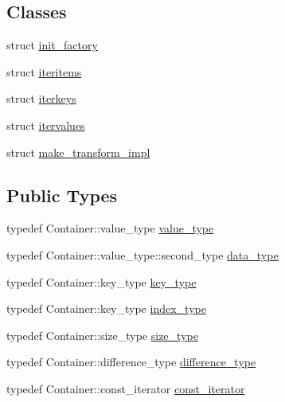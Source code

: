 \subsection*{Classes}
\begin{DoxyCompactItemize}
\item 
struct \hyperlink{structboost_1_1python_1_1std__map__indexing__suite_1_1init__factory}{init\+\_\+factory}
\item 
struct \hyperlink{structboost_1_1python_1_1std__map__indexing__suite_1_1iteritems}{iteritems}
\item 
struct \hyperlink{structboost_1_1python_1_1std__map__indexing__suite_1_1iterkeys}{iterkeys}
\item 
struct \hyperlink{structboost_1_1python_1_1std__map__indexing__suite_1_1itervalues}{itervalues}
\item 
struct \hyperlink{structboost_1_1python_1_1std__map__indexing__suite_1_1make__transform__impl}{make\+\_\+transform\+\_\+impl}
\end{DoxyCompactItemize}
\subsection*{Public Types}
\begin{DoxyCompactItemize}
\item 
typedef Container\+::value\+\_\+type \hyperlink{classboost_1_1python_1_1std__map__indexing__suite_aff9ed68cf30e805a04a313d92c62ab38}{value\+\_\+type}
\item 
typedef Container\+::value\+\_\+type\+::second\+\_\+type \hyperlink{classboost_1_1python_1_1std__map__indexing__suite_a3e9a6a8b8ba34759cf0ba99fe5966041}{data\+\_\+type}
\item 
typedef Container\+::key\+\_\+type \hyperlink{classboost_1_1python_1_1std__map__indexing__suite_a4e2daeb60a58d6ce9964e0ea27680009}{key\+\_\+type}
\item 
typedef Container\+::key\+\_\+type \hyperlink{classboost_1_1python_1_1std__map__indexing__suite_a4b2ac75883fba93dbca6d9e83197c842}{index\+\_\+type}
\item 
typedef Container\+::size\+\_\+type \hyperlink{classboost_1_1python_1_1std__map__indexing__suite_ad1c24ad53b2e27b061f75591c74296c2}{size\+\_\+type}
\item 
typedef Container\+::difference\+\_\+type \hyperlink{classboost_1_1python_1_1std__map__indexing__suite_a54aa644dcb3913334f8b0152901940ef}{difference\+\_\+type}
\item 
typedef Container\+::const\+\_\+iterator \hyperlink{classboost_1_1python_1_1std__map__indexing__suite_aae0c4473455223a4e048cc207ca7b3ea}{const\+\_\+iterator}
\end{DoxyCompactItemize}
